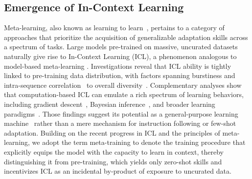 \documentclass{article}
\begin{document}
\subsection{Emergence of In-Context Learning}
Meta-learning, also known as learning to learn~\citep{thrun1998learning,finn2017model,duan2016rl}, pertains to a category of approaches that prioritize the acquisition of generalizable adaptation skills across a spectrum of tasks. 
Large models pre-trained on massive, uncurated datasets naturally give rise to In-Context Learning (ICL), a phenomenon analogous to model-based meta-learning \citep{brown2020language, reed2022generalist, chen2021meta, coda2023meta, raparthy2024generalization, edelman2024evolution, liu2024llms}.
Investigations reveal that ICL ability is tightly linked to pre-training data distribution, with factors spanning burstiness and intra-sequence correlation~\citep{chan2022data,zhao2024analysing,raparthy2024generalization} to overall diversity~\citep{raventos2023pretraining}.
Complementary analyses show that computation-based ICL can emulate a rich spectrum of learning behaviors, including gradient descent~\citep{chan2022transformers,von2023transformers,xieexplanation}, Bayesian inference~\citep{xieexplanation}, and broader learning paradigms~\citep{laskin2022context}. 
Those findings suggest its potential as a general-purpose learning machine~\citep{kirsch2022general,kirsch2023towards,wang2024benchmarking,wang2025putting} rather than a mere mechanism for instruction following or few-shot adaptation.
Building on the recent progress in ICL and the principles of meta-learning, we adopt the term meta-training to denote the training procedure that explicitly equips the model with the capacity to learn in context, thereby distinguishing it from pre-training, which yields only zero-shot skills and incentivizes ICL as an incidental by-product of exposure to uncurated data.
\end{document}
